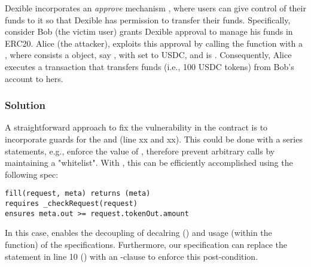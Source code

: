 Dexible incorporates an \textit{approve} mechanism , where users can give control of their funds to it so that Dexible has permission to transfer their funds. Specifically, consider Bob (the victim user) grants Dexible approval to manage his funds in ERC20. Alice (the attacker), exploits this approval by calling the  function with a , where  consists a  object, say , with  set to USDC, and  is . Consequently, Alice executes a transaction that transfers funds (i.e., 100 USDC tokens) from Bob's account to hers. 


\subsubsection{Solution} A straightforward approach to fix the vulnerability in the contract is to incorporate guards for the  and  (line xx and xx). This could be done with a series  statements, e.g., enforce the value of , therefore prevent arbitrary calls by maintaining a "whitelist".  With \lang, this can be efficiently accomplished using the following spec:

\begin{lstlisting}[language=Consol]
fill(request, meta) returns (meta)
requires _checkRequest(request)
ensures meta.out >= request.tokenOut.amount
\end{lstlisting}

In this case, \lang enables the decoupling of decalring () and usage (within the  function) of the specifications. Furthermore, our specification can replace the  statement in line 10 () with an -clause to enforce this post-condition.
\fi



